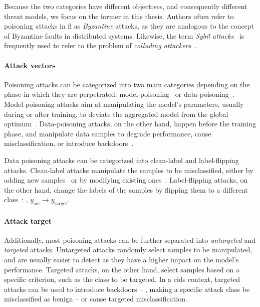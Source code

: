 Because the two categories have different objectives, and consequently different threat models, we focus on the former in this thesis.
Authors often refer to poisoning attacks in \gls{fl} as \emph{Byzantine} attacks, as they are analogous to the concept of Byzantine faults in distributed systems.
Likewise, the term \emph{Sybil attacks}~\cite{douceur_SybilAttack_2002} is frequently used to refer to the problem of \emph{colluding attackers}~\cite{fung_LimitationsFederatedLearning_2020}.

\paragraph{Attack vectors}

Poisoning attacks can be categorized into two main categories depending on the phase in which they are perpetrated: model-poisoning~\cite{bhagoji_AnalyzingFederatedLearning_2019} or data-poisoning~\cite{tolpegin_DataPoisoningAttacks_2020}.
Model-poisoning attacks aim at manipulating the model's parameters, usually during or after training, to deviate the aggregated model from the global optimum~\cite{fang_LocalModelPoisoning_2020}.
Data-poisoning attacks, on the other hand, happen before the training phase, and manipulate data samples to degrade performance, cause misclassification, or introduce backdoors~\cite{rodriguez-barroso_Surveyfederatedlearning_2023}.

Data poisoning attacks can be categorized into clean-label and label-flipping attacks.
Clean-label attacks manipulate the samples to be misclassified, either by adding new samples~\cite{zhang_Evaluationdatapoisoning_2022} or by modifying existing ones~\cite{merzouk_Parameterizingpoisoningattacks_2023}.
Label-flipping attacks, on the other hand, change the labels of the samples by flipping them to a different class~\cite{tolpegin_DataPoisoningAttacks_2020}: \ie, $y_{\text{src}} \rightarrow y_{\text{target}}$. 

\paragraph{Attack target}

Additionally, most poisoning attacks can be further separated into \emph{untargeted} and \emph{targeted} attacks.
Untargeted attacks randomly select samples to be manipulated, and are usually easier to detect as they have a higher impact on the model's performance.
Targeted attacks, on the other hand, select samples based on a specific criterion, such as the class to be targeted.
In a \gls{cids} context, targeted attacks can be used to introduce backdoors -- \ie, making a specific attack class be misclassified as benign -- or cause targeted misclassification.